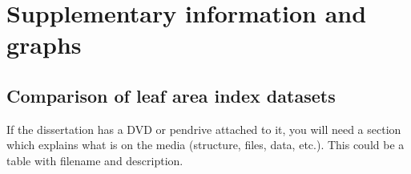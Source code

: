 \chapter{Supplementary information and graphs}
\label{app:supp}

\section{Comparison of leaf area index datasets}

If the dissertation has a DVD or pendrive attached to it, you will need a section which explains what is on the media (structure, files, data, etc.).  This could be a table with filename and description.

\blindtext[5]
